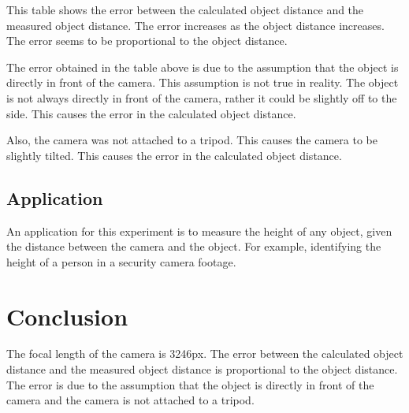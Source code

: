 \documentclass{article}
\begin{document}
This table shows the error between the calculated object distance and the measured object distance. The error increases as the object distance increases. The error seems to be proportional to the object distance.

The error obtained in the table above is due to the assumption that the object is directly in front of the camera. This assumption is not true in reality. The object is not always directly in front of the camera, rather it could be slightly off to the side. This causes the error in the calculated object distance.

Also, the camera was not attached to a tripod. This causes the camera to be slightly tilted. This causes the error in the calculated object distance.

\subsection{Application}
An application for this experiment is to measure the height of any object, given the distance between the camera and the object. For example, identifying the height of a person in a security camera footage.




\section{Conclusion}
The focal length of the camera is 3246px. The error between the calculated object distance and the measured object distance is proportional to the object distance. The error is due to the assumption that the object is directly in front of the camera and the camera is not attached to a tripod.
\end{document}
